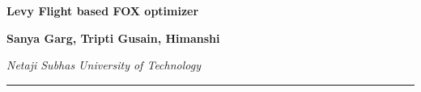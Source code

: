 \documentclass[
]{article}
\author{}
\date{}
\begin{document}
\justify

\begin{center}
{\Large \textbf{Levy Flight based FOX optimizer}}\\
\end{center}


\begin{center}
{\fontsize{10}{14}\selectfont \textbf{Sanya Garg, Tripti Gusain, Himanshi}}
\end{center}

\begin{center}
\emph{Netaji Subhas University of Technology}\\
\vspace{3em} %
\hrule
\end{center}

\vspace{1em} 
\end{document}
